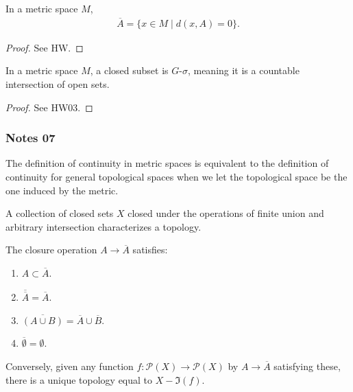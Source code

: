 \documentclass[12pt,letterpaper,reqno]{article}
\begin{document}
\begin{proposition}\label{proposition:closure-in-metric-space}
    In a metric space $M$,
    \begin{align*}
        \overline{A} = \{ x \in M \mid d(x, A) = 0 \}.
    \end{align*}
\end{proposition}

\begin{proof}
    See HW.
\end{proof}

\begin{proposition}\label{proposition:closed-metric-sets-G-sigma}
    In a metric space $M$, a closed subset is $G$-$\sigma$, meaning it is a countable intersection of open sets. 
\end{proposition}

\begin{proof}
    See HW03.
\end{proof}

\subsubsection{Notes 07}

\begin{theorem}\label{theorem:continuity-equiv-metric-general}
    The definition of continuity in metric spaces  is equivalent to the definition of continuity for general topological spaces  when we let the topological space be the one induced by the metric.
\end{theorem}

\begin{lemma}\label{lemma:closed-sets-characterize-a-topology}
    A collection of closed sets $X$ closed under the operations of finite union and arbitrary intersection characterizes a topology.
\end{lemma}

\begin{theorem}\label{theorem:kuratowski-closure-axioms}
    The closure operation $A \to \overline{A}$ satisfies:
    \begin{enumerate}
        \item $A \subset \overline{A}$.
        \item $\overline{\overline{A}} = \overline{A}$.
        \item $\overline{(A \cup B)} = \overline{A} \cup \overline{B}$.
        \item $\overline{\emptyset} = \emptyset$.
    \end{enumerate}
    Conversely, given any function $f:\mathcal{P}(X) \to \mathcal{P}(X)$ by $A \to \overline{A}$ satisfying these, there is a unique topology equal to $X - \Im(f)$.
\end{theorem}
\end{document}
